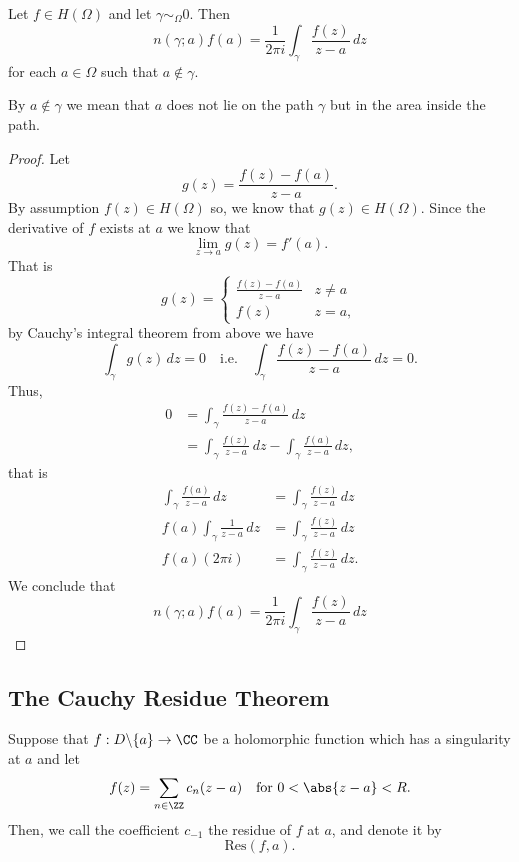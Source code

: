 \documentclass[12pt, a4paper]{article}
\begin{document}
\begin{mdthm}[G-CIF]
    Let \(f \in H(\Omega)\) and let \(\gamma \sim_{\Omega} 0\). Then 
    \[n(\gamma;a)f(a) = \frac{1}{2\pi i} \int_{\gamma} \frac{f(z)}{z-a} \, dz\]
    for each \(a \in \Omega\) such that \(a \not\in \gamma\).
\end{mdthm}

\begin{mdnote}
    By \(a \not\in \gamma\) we mean that \(a\) does not lie on the path \(\gamma\) but in the area inside the path.
\end{mdnote}

\begin{proof}
    Let
    \[g(z) = \frac{f(z)-f(a)}{z-a}.\]
    By assumption \(f(z) \in H(\Omega)\) so, we know that \(g(z) \in H(\Omega)\). Since the derivative of \(f\) exists at \(a\) we know that 
    \[\lim_{z \to a} g(z) =f'(a).\]
    That is 
    \[g(z) = \begin{cases}
        \frac{f(z)-f(a)}{z-a} & z\neq a \\
        f(z) & z=a,
    \end{cases}\]
    by Cauchy's integral theorem from above we have 
    \[\int_{\gamma} g(z) \, dz =0 \quad \text{i.e.} \quad \int_{\gamma} \frac{f(z)-f(a)}{z-a} \, dz =0.\]
    Thus, 
    \[\begin{aligned}
        0 &= \int_{\gamma} \frac{f(z)-f(a)}{z-a} \, dz \\
        &= \int_{\gamma} \frac{f(z)}{z-a} \, dz -\int_{\gamma} \frac{f(a)}{z-a} \, dz,
    \end{aligned}\]
    that is 
    \[\begin{aligned}
        \int_{\gamma} \frac{f(a)}{z-a} \, dz &=\int_{\gamma} \frac{f(z)}{z-a} \, dz \\
        f(a) \int_{\gamma} \frac{1}{z-a} \, dz &= \int_{\gamma}\frac{f(z)}{z-a} \, dz \\
        f(a)(2\pi i) &=\int_{\gamma}\frac{f(z)}{z-a} \, dz.
    \end{aligned}\]
    We conclude that 
    \[n(\gamma;a)f(a) = \frac{1}{2\pi i} \int_{\gamma} \frac{f(z)}{z-a} \, dz\]
\end{proof}

\subsection{The Cauchy Residue Theorem}

\begin{definition}
    Suppose that \(f: D \backslash \{a\} \to \CC\) be a holomorphic function which has a singularity at \(a\) and let 
    \[f(z) = \sum_{n \in \ZZ} c_n (z-a) \quad \text{for } 0<\abs{z-a}<R.\]
    Then, we call the coefficient \(c_{-1}\) the residue of \(f\) at \(a\), and denote it by 
    \[\text{Res}(f,a).\]
\end{definition}
\end{document}
